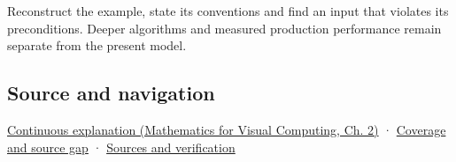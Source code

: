 Reconstruct the example, state its conventions and find an input that violates its preconditions. Deeper algorithms and measured production performance remain separate from the present model.

\subsection{Source and navigation}\label{appendix-175ca5ff874d-source-and-navigation}

\href{../02-Mathematics-for-Visual-Computing/main.pdf\#nameddest=01-foundations-i-ch018-keep-the-promises-visible-while-moving-between-representations}{Continuous explanation (Mathematics for Visual Computing, Ch. 2)} · \hyperref[appendix-fd090d982a15-phase-7---parts-601-700]{Coverage and source gap} · \hyperref[appendix-a103e7846d21-phase-7---source-analysis-and-verification]{Sources and verification}
